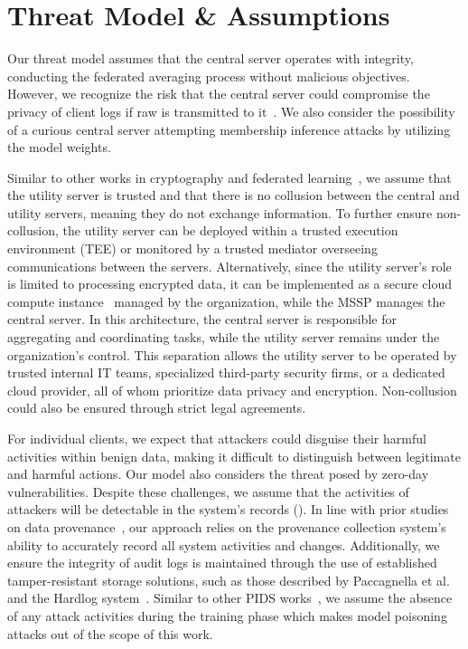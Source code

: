 
\section{Threat Model \& Assumptions}

Our threat model assumes that the central server operates with integrity, conducting the federated averaging process without malicious objectives. However, we recognize the risk that the central server could compromise the privacy of client logs if raw \logs is transmitted to it~\cite{man2021intelligent,li2023efficient}. We also consider the possibility of a curious central server attempting membership inference attacks by utilizing the model weights.

Similar to other works in cryptography and federated learning~\cite{roy2020crypte,wu2022federated}, we assume that the utility server is trusted and that there is no collusion between the central and utility servers, meaning they do not exchange information. To further ensure non-collusion, the utility server can be deployed within a trusted execution environment (TEE)\cite{mckeen2016intel} or monitored by a trusted mediator overseeing communications between the servers\cite{alwen2009collusion}. Alternatively, since the utility server's role is limited to processing encrypted data, it can be implemented as a secure cloud compute instance~\cite{cloudinstance} managed by the organization, while the MSSP manages the central server. In this architecture, the central server is responsible for aggregating and coordinating tasks, while the utility server remains under the organization's control. This separation allows the utility server to be operated by trusted internal IT teams, specialized third-party security firms, or a dedicated cloud provider, all of whom prioritize data privacy and encryption. Non-collusion could also be ensured through strict legal agreements.

For individual clients, we expect that attackers could disguise their harmful activities within benign data, making it difficult to distinguish between legitimate and harmful actions. Our model also considers the threat posed by zero-day vulnerabilities. Despite these challenges, we assume that the activities of attackers will be detectable in the system's records (\logs). In line with prior studies on data provenance~\cite{nodoze2019, priotracker2018, mzx2016, bates2017transparent, omegalog, rapsheet2020, provthings2018, dossier, inam2023sok, poirot2019, kwon18mci, winnower2018, lzx2013, ma2015accurate, ma2018kernel, mpi}, our approach relies on the provenance collection system's ability to accurately record all system activities and changes. Additionally, we ensure the integrity of audit logs is maintained through the use of established tamper-resistant storage solutions, such as those described by Paccagnella et al.~\cite{paccagnella2020custos} and the Hardlog system~\cite{hardlog}. Similar to other PIDS works~\cite{cheng2023kairos, flash2024, yangprographer, wang2022threatrace, provdetector2020}, we assume the absence of any attack activities during the training phase which makes model poisoning attacks out of the scope of this work.

